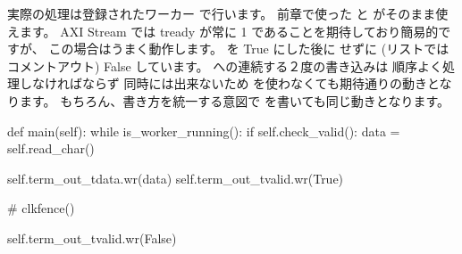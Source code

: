 実際の処理は登録されたワーカー  で行います。
前章で使った  と 
がそのまま使えます。
AXI Stream では tready が常に 1 であることを期待しており簡易的ですが、
この場合はうまく動作します。
 を True にした後に 
 せずに
(リストではコメントアウト)
False しています。
 への連続する２度の書き込みは
順序よく処理しなければならず
同時には出来ないため
 を使わなくても期待通りの動きとなります。
もちろん、書き方を統一する意図で
 を書いても同じ動きとなります。

\begin{python}[label=UART2AXIS-main, caption="UART2AXIS の main ワーカー"]
    def main(self):
        while is_worker_running():
            if self.check_valid():
                data = self.read_char()

                self.term_out_tdata.wr(data)
                self.term_out_tvalid.wr(True)

                # clkfence()

                self.term_out_tvalid.wr(False)
\end{python}

